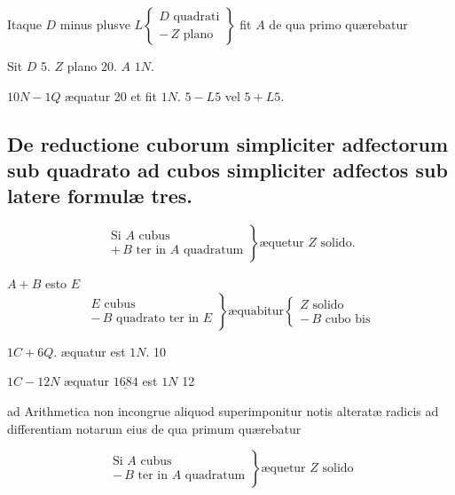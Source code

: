 \documentclass[11pt,a4paper]{article}
\begin{document}
Itaque $D$ minus plusve $L \left\{ \begin{array}{l} D \text{ quadrati} \\ -\,Z \text{ plano} \end{array} \right\}$ fit $A$ de qua primo quærebatur

Sit $D$ 5. $Z$ plano 20. $A$ $1N$.

$10N - 1Q$ æquatur 20 et fit $1N$. $5 - L5$ vel $5 + L5$.

\subsection*{De reductione cuborum simpliciter adfectorum sub quadrato ad cubos simpliciter adfectos sub latere formulæ tres.}

\[ \left. \begin{array}{l} \text{Si } A \text{ cubus} \\ +\,B \text{ ter in } A \text{ quadratum} \end{array} \right\} \text{æquetur } Z \text{ solido.} \]

$A + B$ esto $E$
\[ \left. \begin{array}{l} E \text{ cubus} \\ -\,B \text{ quadrato ter in } E \end{array} \right\} \text{æquabitur} \left\{ \begin{array}{l} Z \text{ solido} \\ -\,B \text{ cubo bis} \end{array} \right. \]

$1C + 6Q$. æquatur  est $1N$. 10

$1C - 12N$ æquatur $\underline{1684}$ est $1N$ 12

ad Arithmetica non incongrue  aliquod superimponitur notis alteratæ radicis ad differentiam notarum eius de qua primum quærebatur

\[ \left. \begin{array}{l} \text{Si } A \text{ cubus} \\ -\,B \text{ ter in } A \text{ quadratum} \end{array} \right\} \text{æquetur } Z \text{ solido} \]
\end{document}
